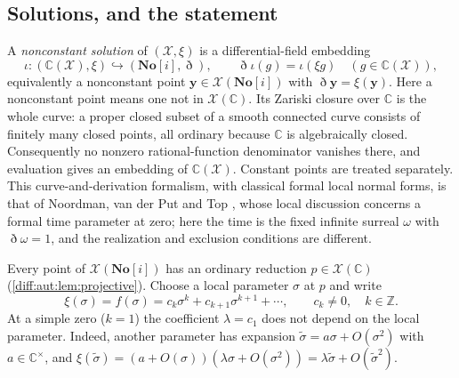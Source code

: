 \documentclass[11pt,letterpaper]{article}
\numberwithin{equation}{section}
\theoremstyle{definition}
\theoremstyle{remark}
\newcommand{\SC}{\mathbf{No}[i]}
\newcommand{\C}{\mathbb C}
\newcommand{\Z}{\mathbb Z}
\newcommand{\Dn}{\eth}
\begin{document}
\subsection{Solutions, and the statement}
\label{diff:aut:sub:statement}

A \emph{nonconstant solution} of $(\mathcal X,\xi)$ is a differential-field
embedding
\begin{equation}\label{diff:aut:eq:embedding}
 \iota:(\C(\mathcal X),\xi)\hookrightarrow(\SC,\Dn),
 \qquad \Dn\iota(g)=\iota(\xi g)\quad(g\in\C(\mathcal X)),
\end{equation}
equivalently a nonconstant point $\mathbf y\in\mathcal X(\SC)$ with
$\Dn\mathbf y=\xi(\mathbf y)$. Here a nonconstant point means one not in $\mathcal X(\C)$.
Its Zariski closure over $\C$ is the whole curve: a proper closed
subset of a smooth connected curve consists of finitely many closed
points, all ordinary because $\C$ is algebraically closed.
Consequently no nonzero rational-function denominator vanishes there,
and evaluation gives an embedding of $\C(\mathcal X)$.
Constant points are treated separately. This
curve-and-derivation formalism, with classical formal local normal forms, is
that of Noordman, van der Put and Top \cite{NPT}, whose local discussion
concerns a formal time parameter at zero; here the time is the fixed infinite
surreal $\omega$ with $\Dn\omega=1$, and the realization and exclusion conditions
are different.

Every point of $\mathcal X(\SC)$ has an ordinary reduction $p\in\mathcal X(\C)$
(\cref{diff:aut:lem:projective}). Choose a local parameter $\sigma$ at $p$ and
write
\begin{equation}\label{diff:aut:eq:localfield}
 \xi(\sigma)=f(\sigma)=c_{k}\sigma^{k}+c_{k+1}\sigma^{k+1}+\cdots,
 \qquad c_{k}\neq0,\quad k\in\Z .
\end{equation}
At a simple zero ($k=1$) the coefficient $\lambda=c_1$ does not
depend on the local parameter. Indeed, another parameter has expansion
$\widetilde\sigma=a\sigma+O(\sigma^2)$ with $a\in\C^\times$, and
$\xi(\widetilde\sigma)=(a+O(\sigma))(\lambda\sigma+O(\sigma^2))
=\lambda\widetilde\sigma+O(\widetilde\sigma^2)$.
\end{document}

